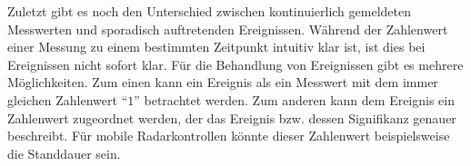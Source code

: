 Zuletzt gibt es noch den Unterschied zwischen kontinuierlich gemeldeten Messwerten und sporadisch auftretenden Ereignissen.
Während der Zahlenwert einer Messung zu einem bestimmten Zeitpunkt intuitiv klar ist, ist dies bei Ereignissen nicht sofort klar.
Für die Behandlung von Ereignissen gibt es mehrere Möglichkeiten.
Zum einen kann ein Ereignis als ein Messwert mit dem immer gleichen Zahlenwert "`$1$"' betrachtet werden.
Zum anderen kann dem Ereignis ein Zahlenwert zugeordnet werden, der das Ereignis bzw. dessen Signifikanz genauer beschreibt.
Für mobile Radarkontrollen könnte dieser Zahlenwert beispielsweise die Standdauer sein.
